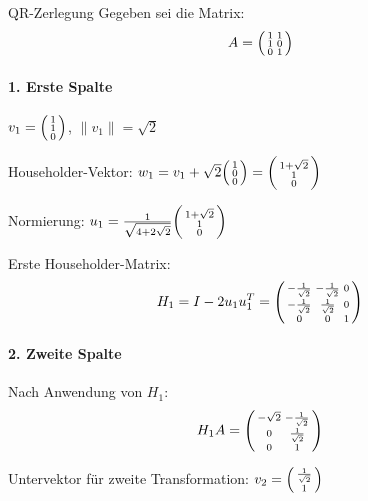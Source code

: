 \begin{example2}{QR-Zerlegung}
Gegeben sei die Matrix:
$$A = \begin{psmallmatrix}
1 & 1\\
1 & 0\\
0 & 1
\end{psmallmatrix}$$

\paragraph{1. Erste Spalte}
$v_1 = \begin{psmallmatrix} 1\\ 1\\ 0 \end{psmallmatrix}$, 
$\|v_1\| = \sqrt{2}$

Householder-Vektor:
$w_1 = v_1 + \sqrt{2}\begin{psmallmatrix} 1\\ 0\\ 0 \end{psmallmatrix} = 
\begin{psmallmatrix} 1+\sqrt{2}\\ 1\\ 0 \end{psmallmatrix}$

Normierung:
$u_1 = \frac{1}{\sqrt{4+2\sqrt{2}}}
\begin{psmallmatrix} 1+\sqrt{2}\\ 1\\ 0 \end{psmallmatrix}$

Erste Householder-Matrix:
$$H_1 = I - 2u_1u_1^T = 
\begin{psmallmatrix}
-\frac{1}{\sqrt{2}} & -\frac{1}{\sqrt{2}} & 0\\
-\frac{1}{\sqrt{2}} & \frac{1}{\sqrt{2}} & 0\\
0 & 0 & 1
\end{psmallmatrix}$$

\paragraph{2. Zweite Spalte}
Nach Anwendung von $H_1$:
$$H_1A = \begin{psmallmatrix}
-\sqrt{2} & -\frac{1}{\sqrt{2}}\\
0 & \frac{1}{\sqrt{2}}\\
0 & 1
\end{psmallmatrix}$$

Untervektor für zweite Transformation:
$v_2 = \begin{psmallmatrix} \frac{1}{\sqrt{2}}\\ 1 \end{psmallmatrix}$


\end{example2}
